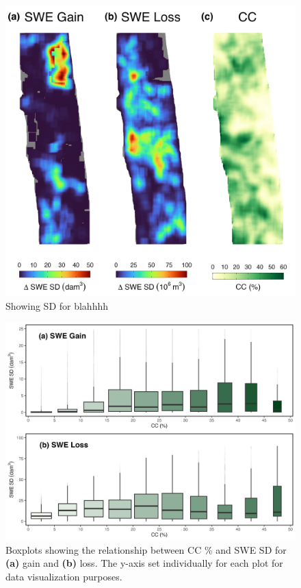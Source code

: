 \clearpage
\begin{figure}[t]
\centering
\label{fig:dswe_standard_deviation}
\includegraphics[width=\textwidth]{figures/ch4_figs/sd_vs_cc_map_dam3_41x41.png}
\caption{Showing SD for blahhhh}
\end{figure}

\clearpage
\begin{figure}[t]
\centering
\label{fig:dswe_boxplots}
\includegraphics[width=\textwidth]{figures/ch4_figs/swe_sd_bp_dam3_41x41_v1.png}
\caption{Boxplots showing the relationship between CC \% and SWE SD for \textbf{(a)} gain and \textbf{(b)} loss. The y-axis set individually for each plot for data visualization purposes.}
\end{figure}






